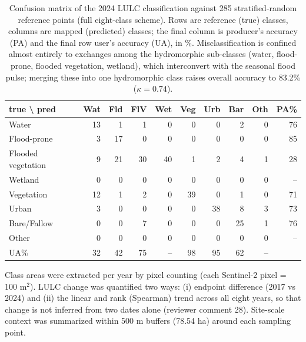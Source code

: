 \documentclass[preprint,authoryear,12pt]{elsarticle}
\begin{document}
\begin{table}[htbp]\centering
\caption{Confusion matrix of the 2024 LULC classification against 285 stratified-random
reference points (full eight-class scheme). Rows are reference (true) classes, columns are
mapped (predicted) classes; the final column is producer's accuracy (PA) and the final row
user's accuracy (UA), in \%. Misclassification is confined almost entirely to exchanges among
the hydromorphic sub-classes (water, flood-prone, flooded vegetation, wetland), which
interconvert with the seasonal flood pulse; merging these into one hydromorphic class raises
overall accuracy to 83.2\% ($\kappa=0.74$).}
\label{tab:confusion}
\small\setlength{\tabcolsep}{4pt}
\begin{tabular}{lrrrrrrrr|r}
\hline
true \textbackslash{} pred & Wat & Fld & FlV & Wet & Veg & Urb & Bar & Oth & PA\% \\
\hline
Water              & 13 & 1  & 1  & 0  & 0  & 0  & 2  & 0 & 76 \\
Flood-prone        & 3  & 17 & 0  & 0  & 0  & 0  & 0  & 0 & 85 \\
Flooded vegetation & 9  & 21 & 30 & 40 & 1  & 2  & 4  & 1 & 28 \\
Wetland            & 0  & 0  & 0  & 0  & 0  & 0  & 0  & 0 & -- \\
Vegetation         & 12 & 1  & 2  & 0  & 39 & 0  & 1  & 0 & 71 \\
Urban              & 3  & 0  & 0  & 0  & 0  & 38 & 8  & 3 & 73 \\
Bare/Fallow        & 0  & 0  & 7  & 0  & 0  & 0  & 25 & 1 & 76 \\
Other              & 0  & 0  & 0  & 0  & 0  & 0  & 0  & 0 & -- \\
\hline
UA\%               & 32 & 42 & 75 & -- & 98 & 95 & 62 & -- &    \\
\hline
\end{tabular}
\end{table}

Class areas were extracted per year by pixel counting (each Sentinel-2 pixel = 100 m$^2$).
LULC change was quantified two ways: (i) endpoint difference (2017 vs 2024) and (ii) the
linear and rank (Spearman) trend across all eight years, so that change is not inferred from
two dates alone (reviewer comment 28). Site-scale context was summarized within 500 m buffers
(78.54 ha) around each sampling point.
\end{document}
